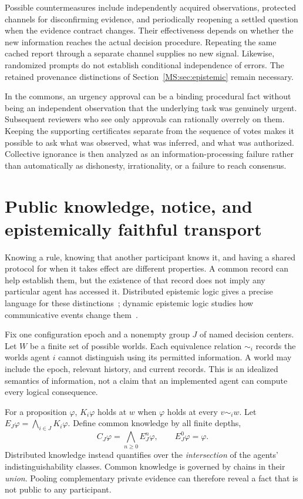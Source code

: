 Possible countermeasures include independently acquired observations, protected channels for disconfirming evidence, and periodically reopening a settled question when the evidence contract changes. Their effectiveness depends on whether the new information reaches the actual decision procedure. Repeating the same cached report through a separate channel supplies no new signal. Likewise, randomized prompts do not establish conditional independence of errors. The retained provenance distinctions of Section~\ref{MS:sec:epistemic} remain necessary.

In the commons, an urgency approval can be a binding procedural fact without being an independent observation that the underlying task was genuinely urgent. Subsequent reviewers who see only approvals can rationally overrely on them. Keeping the supporting certificates separate from the sequence of votes makes it possible to ask what was observed, what was inferred, and what was authorized. Collective ignorance is then analyzed as an information-processing failure rather than automatically as dishonesty, irrationality, or a failure to reach consensus.


\section{Public knowledge, notice, and epistemically faithful transport}\label{MS:sec:publicknowledge}
Knowing a rule, knowing that another participant knows it, and having a shared protocol for when it takes effect are different properties. A common record can help establish them, but the existence of that record does not imply any particular agent has accessed it. Distributed epistemic logic gives a precise language for these distinctions~\cite{MS:halpernmoses}; dynamic epistemic logic studies how communicative events change them~\cite{MS:baltag}.

Fix one configuration epoch and a nonempty group $J$ of named decision centers. Let $W$ be a finite set of possible worlds. Each equivalence relation $\sim_i$ records the worlds agent $i$ cannot distinguish using its permitted information. A world may include the epoch, relevant history, and current records. This is an idealized semantics of information, not a claim that an implemented agent can compute every logical consequence.

For a proposition $\varphi$, $K_i\varphi$ holds at $w$ when $\varphi$ holds at every $v\sim_i w$. Let $E_J\varphi=\bigwedge_{i\in J}K_i\varphi$. Define common knowledge by all finite depths,
\[
C_J\varphi=\bigwedge_{n\ge0}E_J^n\varphi,
\qquad E_J^0\varphi=\varphi.
\]
Distributed knowledge instead quantifies over the \emph{intersection} of the agents' indistinguishability classes. Common knowledge is governed by chains in their \emph{union}. Pooling complementary private evidence can therefore reveal a fact that is not public to any participant.

